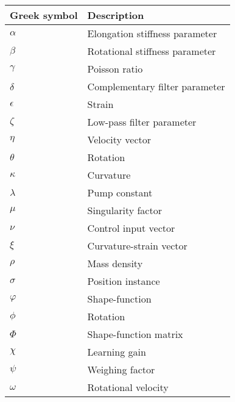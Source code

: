 \begin{spacing}{0.9}
\begin{multicols}{2}
\begin{table}[H]
\centering
    \begin{tabular}{p{2.5cm} p{3.4cm}} \hline
    \textbf{Greek symbol}    &   \textbf{Description }\\ \hline
    $\alpha$      & Elongation stiffness parameter  \\
    $\beta$       & Rotational stiffness parameter \\
    $\gamma$      & Poisson ratio \\
    $\delta$      & Complementary filter parameter \\
    $\epsilon$    & Strain \\
    $\zeta$       & Low-pass filter parameter \\
    $\eta$        & Velocity vector \\
    $\theta$      & Rotation \\
    $\kappa$      & Curvature \\
    $\lambda$     & Pump constant \\
    $\mu$         & Singularity factor \\
    $\nu$         & Control input vector \\
    $\xi$         & Curvature-strain vector \\
    $\rho$        & Mass density \\
    $\sigma$      & Position instance \\
    $\varphi$     & Shape-function \\
    $\phi$        & Rotation  \\
    $\Phi$        & Shape-function matrix \\
    $\chi$         & Learning gain \\
    $\psi$        & Weighing factor \\
    $\omega$      &  Rotational velocity \\ \hline

    
    \end{tabular}
\end{table}



\end{multicols}
\end{spacing}
